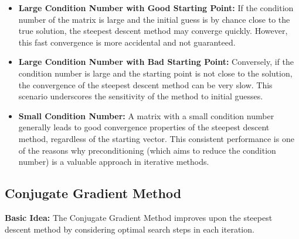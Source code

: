 \documentclass[unicode,11pt,a4paper,oneside,numbers=endperiod,openany]{scrartcl}
\begin{document}
\begin{itemize}
    \item \textbf{Large Condition Number with Good Starting Point:}
    If the condition number of the matrix is large and the initial guess is by chance close to the true solution, the steepest descent method may converge quickly. However, this fast convergence is more accidental and not guaranteed.

    \item \textbf{Large Condition Number with Bad Starting Point:}
    Conversely, if the condition number is large and the starting point is not close to the solution, the convergence of the steepest descent method can be very slow. This scenario underscores the sensitivity of the method to initial guesses.

    \item \textbf{Small Condition Number:}
    A matrix with a small condition number generally leads to good convergence properties of the steepest descent method, regardless of the starting vector. This consistent performance is one of the reasons why preconditioning (which aims to reduce the condition number) is a valuable approach in iterative methods.
\end{itemize}
\subsection{Conjugate Gradient Method}

\textbf{Basic Idea:}
The Conjugate Gradient Method improves upon the steepest descent method by considering optimal search steps in each iteration.
\end{document}
